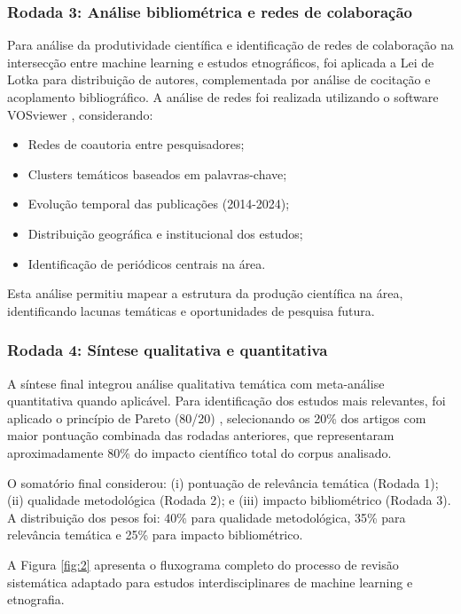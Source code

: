 \subsubsection*{Rodada 3: Análise bibliométrica e redes de colaboração}

Para análise da produtividade científica e identificação de redes de colaboração na intersecção entre machine learning e estudos etnográficos, foi aplicada a Lei de Lotka \cite{Lotka1926} para distribuição de autores, complementada por análise de cocitação e acoplamento bibliográfico. A análise de redes foi realizada utilizando o software VOSviewer \cite{VanEck2010}, considerando:

\begin{itemize}
\item Redes de coautoria entre pesquisadores;
\item Clusters temáticos baseados em palavras-chave;
\item Evolução temporal das publicações (2014-2024);
\item Distribuição geográfica e institucional dos estudos;
\item Identificação de periódicos centrais na área.
\end{itemize}

Esta análise permitiu mapear a estrutura da produção científica na área, identificando lacunas temáticas e oportunidades de pesquisa futura.

\subsubsection*{Rodada 4: Síntese qualitativa e quantitativa}

A síntese final integrou análise qualitativa temática com meta-análise quantitativa quando aplicável. Para identificação dos estudos mais relevantes, foi aplicado o princípio de Pareto (80/20) \cite{Pareto1964}, selecionando os 20\% dos artigos com maior pontuação combinada das rodadas anteriores, que representaram aproximadamente 80\% do impacto científico total do corpus analisado.

O somatório final considerou: (i) pontuação de relevância temática (Rodada 1); (ii) qualidade metodológica (Rodada 2); e (iii) impacto bibliométrico (Rodada 3). A distribuição dos pesos foi: 40\% para qualidade metodológica, 35\% para relevância temática e 25\% para impacto bibliométrico.

A Figura \ref{fig:2} apresenta o fluxograma completo do processo de revisão sistemática adaptado para estudos interdisciplinares de machine learning e etnografia.

